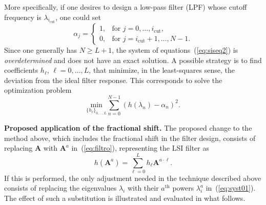 More specifically, if one desires to design a low-pass filter (LPF) whose cutoff frequency is $ \lambda_{i_\text{cut}} $, one could set
\begin{equation}
\label{eq:alfas}
\alpha_j = 
\left\{\begin{array}{ll}
1, & \text{for } j = 0,\ldots, i_\text{cut},\\ 
0, & \text{for } j = i_\text{cut}+1,\ldots,N-1.
\end{array}\right.
\end{equation}
Since one generally has $ N \geq L+1$, the system of equations~(\ref{eq:siseq2}) is \emph{overdetermined} and does not have an exact solution. A possible strategy is to find coefficients $ h_\ell $, $ \ell=0, \dots, L$, that minimize, in the least-squares sense, the deviation from the ideal filter response. This corresponds to solve the optimization problem
\begin{equation}
\label{eq:opt}
\underset{\{h_\ell\}_{0, \dots, L}}{\text{min}} \sum_{n=0}^{N-1} \left( h(\lambda_n) - \alpha_n \right)^2.
\end{equation}

\noindent\textbf{Proposed application of the fractional shift.} The proposed change to the method above, which includes the fractional shift in the filter design, consists of replacing $\mathbf{A}$ with $\mathbf{A}^a$ in~(\ref{eq:filtro}), representing the LSI filter as
\begin{equation}
\label{eq:filtrofracnew}
h(\mathbf{A}^a) = \sum_{\ell=0}^{L} h_\ell \mathbf{A}^{a \cdot \ell}.
\end{equation}
If this is performed, the only adjustment needed in the technique described above consists of replacing the eigenvalues $\lambda_i$ with their $a^{\text{th}}$ powers $\lambda_i^a$ in~(\ref{eq:syst01}). The effect of such a substitution is illustrated and evaluated in what follows.

